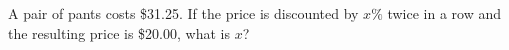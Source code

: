A pair of pants costs \$31.25. If the price is discounted by $x\%$ twice in a row and the resulting price is \$20.00, what is $x$?
